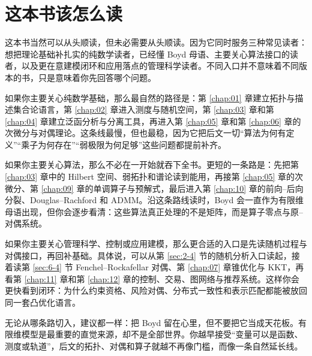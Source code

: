 \section{这本书该怎么读}

\label{sec:0-3}

这本书当然可以从头顺读，但未必需要从头顺读。因为它同时服务三种常见读者：想把理论基础补扎实的纯数学读者，已经懂 Boyd 母语、主要关心算法接口的读者，以及更在意建模闭环和应用落点的管理科学读者。不同入口并不意味着不同版本的书，只是意味着你先回答哪个问题。

如果你主要关心纯数学基础，那么最自然的路径是：第 \ref{chap:01} 章建立拓扑与描述集合论语言，第 \ref{chap:02} 章进入测度与随机空间，第 \ref{chap:03} 章和第 \ref{chap:04} 章建立泛函分析与分离工具，再进入第 \ref{chap:05} 章和第 \ref{chap:06} 章的次微分与对偶理论。这条线最慢，但也最稳，因为它把后文一切“算法为何有定义”“乘子为何存在”“弱极限为何足够”这些问题都提前补齐。

如果你主要关心算法，那么不必在一开始就吞下全书。更短的一条路是：先把第 \ref{chap:03} 章中的 Hilbert 空间、弱拓扑和谱论读到能用，再接第 \ref{chap:05} 章的次微分、第 \ref{chap:09} 章的单调算子与预解式，最后进入第 \ref{chap:10} 章的前向--后向分裂、Douglas--Rachford 和 ADMM。沿这条路线读时，Boyd 会一直作为有限维母语出现，但你会逐步看清：这些算法真正处理的不是矩阵，而是算子零点与原--对偶系统。

如果你主要关心管理科学、控制或应用建模，那么更合适的入口是先读随机过程与对偶接口，再回补基础。具体说，可以从第 \ref{sec:2-4} 节的随机分析入口读起，接着读第 \ref{sec:6-4} 节 Fenchel--Rockafellar 对偶、第 \ref{chap:07} 章锥优化与 KKT，再看第 \ref{chap:11} 章和第 \ref{chap:12} 章的控制、交易、图网络与推荐系统。这样你会更快看到闭环：为什么约束资格、风险对偶、分布式一致性和表示匹配都能被放回同一套凸优化语言。

无论从哪条路切入，建议都一样：把 Boyd 留在心里，但不要把它当成天花板。有限维模型是最重要的直觉来源，却不是全部世界。你越早接受“变量可以是函数、测度或轨道”，后文的拓扑、对偶和算子就越不再像门槛，而像一条自然延长线。
